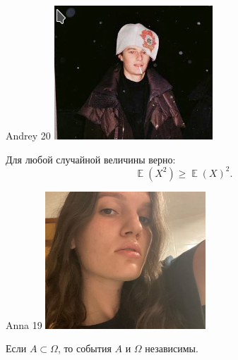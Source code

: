 \documentclass[12pt]{article}
\DeclareMathOperator{\E}{\mathbb{E}}
\begin{document}
\begin{minipage}{0.45\textwidth}
\begin{tinderm}{Andrey 20}
\includegraphics[width=\textwidth]{tinder-photo/andrey_2.png}

  

\begin{mybox}
Для любой случайной величины верно:
\[
\E(X^2) \ge \E(X)^2.
\]
\end{mybox}
\end{tinderm}
\end{minipage}
%
%
\begin{minipage}{0.45\textwidth}
\begin{tinderf}{Anna 19}
\includegraphics[width=\textwidth]{tinder-photo/anna.png}

  

\begin{mybox}
Если $A \subset \Omega$, то события $A$ и $\Omega$ независимы.
\end{mybox}
\end{tinderf}
\end{minipage}
\end{document}
